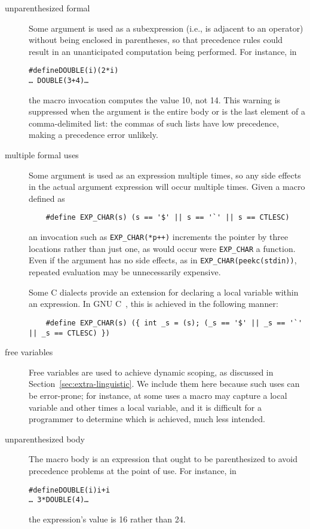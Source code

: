 \documentclass[10pt]{article}
\begin{document}
\begin{description}
\item[unparenthesized formal]
        Some argument is used as a subexpression (i.e., is adjacent to an
        operator) without being enclosed in parentheses, so that precedence
        rules could result in an unanticipated computation being performed.
        For instance, in
\begin{alltt}
    #define DOUBLE(i) (2*i)
    \ldots\ DOUBLE(3+4) \ldots
\end{alltt}
        the macro invocation computes the value 10, not 14.
        This warning is suppressed when the argument is the entire body
        or is the last element of a comma-delimited list:  the commas of
        such lists have low precedence, making a precedence error unlikely.

\item[multiple formal uses]
  Some argument is used as an expression multiple times, so any side
  effects in the actual argument expression will occur multiple times.
  Given a macro defined as
\begin{verbatim}
    #define EXP_CHAR(s) (s == '$' || s == '`' || s == CTLESC)
\end{verbatim}
  an invocation such as {\tt \verb|EXP_CHAR|(*p++)} increments the pointer
  by three locations rather than just one, as would occur
  were \verb|EXP_CHAR| a function.  Even if the argument has no side
  effects, as in {\tt \verb|EXP_CHAR|(peekc(stdin))}, repeated evaluation may be
  unnecessarily expensive.
        
  Some C dialects provide an extension for declaring a local variable
  within an expression.  In GNU C~\cite{GCC}, this is achieved in the
  following manner:
\begin{verbatim}
    #define EXP_CHAR(s) ({ int _s = (s); (_s == '$' || _s == '`' || _s == CTLESC) })
\end{verbatim}

\item[free variables]
  Free variables are used to achieve dynamic scoping, as discussed in
  Section~\ref{sec:extra-linguistic}.  We include them here because such
  uses can be error-prone; for instance, at some uses a macro may capture a
  local variable and other times a local variable, and it is difficult for
  a programmer to determine which is achieved, much less intended.

\item[unparenthesized body]
        The macro body is an expression that ought to be parenthesized to
        avoid precedence problems at the point of use.  For instance, in
\begin{alltt}
    #define DOUBLE(i) i+i
    \ldots\ 3*DOUBLE(4) \ldots
\end{alltt}
        the expression's value is 16 rather than 24.
        

\end{description}
\end{document}
